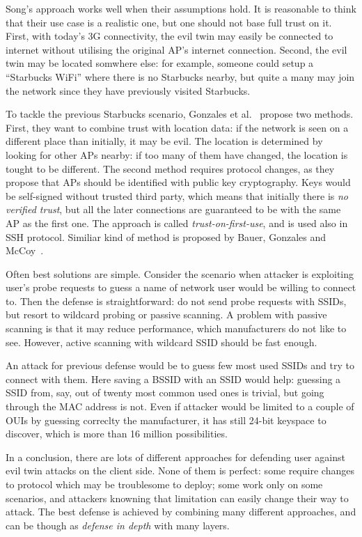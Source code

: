 \documentclass[12pt,a4paper,oneside,pdftex]{report}
\begin{document}
Song's approach works well when their assumptions hold. It is reasonable to think that their use case is a realistic one, but one should not base full trust on it. First, with today's 3G connectivity, the evil twin may easily be connected to internet without utilising the original AP's internet connection. Second, the evil twin may be located somwhere else: for example, someone could setup a ``Starbucks WiFi'' where there is no Starbucks nearby, but quite a many may join the network since they have previously visited Starbucks.

To tackle the previous Starbucks scenario, Gonzales et al.~\cite{gonzales2010practical} propose two methods. First, they want to combine trust with location data: if the network is seen on a different place than initially, it may be evil. The location is determined by looking for other APs nearby: if too many of them have changed, the location is tought to be different. The second method requires protocol changes, as they propose that APs should be identified with public key cryptography. Keys would be self-signed without trusted third party, which means that initially there is \emph{no verified trust}, but all the later connections are guaranteed to be with the same AP as the first one. The approach is called \emph{trust-on-first-use}, and is used also in SSH protocol. Similiar kind of method is proposed by Bauer, Gonzales and McCoy~\cite{bauer2008mitigating}.

Often best solutions are simple. Consider the scenario when attacker is exploiting user's probe requests to guess a name of network user would be willing to connect to. Then the defense is straightforward: do not send probe requests with SSIDs, but resort to wildcard probing or passive scanning. A problem with passive scanning is that it may reduce performance, which manufacturers do not like to see. However, active scanning with wildcard SSID should be fast enough.

An attack for previous defense would be to guess few most used SSIDs and try to connect with them. Here saving a BSSID with an SSID would help: guessing a SSID from, say, out of twenty most common used ones is trivial, but going through the MAC address is not. Even if attacker would be limited to a couple of OUIs by guessing correclty the manufacturer, it has still 24-bit keyspace to discover, which is more than 16 million possibilities.

In a conclusion, there are lots of different approaches for defending user against evil twin attacks on the client side. None of them is perfect: some require changes to protocol which may be troublesome to deploy; some work only on some scenarios, and attackers knowning that limitation can easily change their way to attack. The best defense is achieved by combining many different approaches, and can be though as \emph{defense in depth} with many layers.
\end{document}
